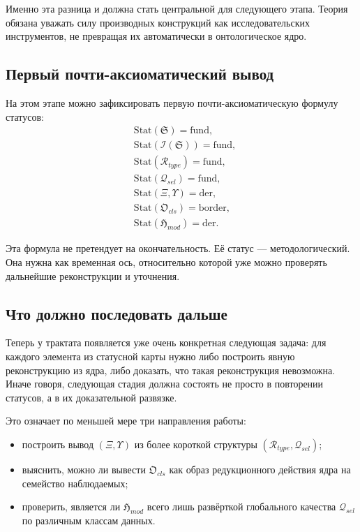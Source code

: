 \documentclass[12pt,a4paper]{article}
\begin{document}
Именно эта разница и должна стать центральной для следующего этапа. Теория обязана уважать силу производных конструкций как исследовательских инструментов, не превращая их автоматически в онтологическое ядро.

\subsection{Первый почти-аксиоматический вывод}

На этом этапе можно зафиксировать первую почти-аксиоматическую формулу статусов:
\begin{align}
&\mathrm{Stat}(\mathfrak{S})=\mathrm{fund}, \\
&\mathrm{Stat}(\mathcal{I}(\mathfrak{S}))=\mathrm{fund}, \\
&\mathrm{Stat}(\mathcal{R}_{type})=\mathrm{fund}, \\
&\mathrm{Stat}(\mathcal{Q}_{sel})=\mathrm{fund}, \\
&\mathrm{Stat}(\Xi,\Upsilon)=\mathrm{der}, \\
&\mathrm{Stat}(\mathfrak{O}_{cls})=\mathrm{border}, \\
&\mathrm{Stat}(\mathfrak{H}_{mod})=\mathrm{der}.
\end{align}

Эта формула не претендует на окончательность. Её статус --- методологический. Она нужна как временная ось, относительно которой уже можно проверять дальнейшие реконструкции и уточнения.

\subsection{Что должно последовать дальше}

Теперь у трактата появляется уже очень конкретная следующая задача: для каждого элемента из статусной карты нужно либо построить явную реконструкцию из ядра, либо доказать, что такая реконструкция невозможна. Иначе говоря, следующая стадия должна состоять не просто в повторении статусов, а в их доказательной развязке.

Это означает по меньшей мере три направления работы:
\begin{itemize}
    \item построить вывод \((\Xi,\Upsilon)\) из более короткой структуры \((\mathcal{R}_{type},\mathcal{Q}_{sel})\);
    \item выяснить, можно ли вывести \(\mathfrak{O}_{cls}\) как образ редукционного действия ядра на семейство наблюдаемых;
    \item проверить, является ли \(\mathfrak{H}_{mod}\) всего лишь развёрткой глобального качества \(\mathcal{Q}_{sel}\) по различным классам данных.
\end{itemize}
\end{document}
